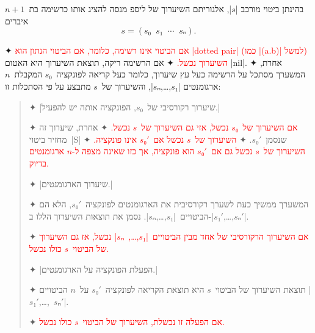\minipage\textwidth
\newcommand\exception[1]{{\textcolor{red}{#1}}}
\begin{mdframed}[backgroundcolor=Lavender!20]
  \footnotesize
  בהינתן ביטוי מורכב \E|$s$|, אלגוריתם השיערוך של ליספ מנסה
  להציג אותו כרשימה בת~$n+1$ איברים \[
    s=(s₀\;\;s₁\;\;⋯\;\;sₙ).
\] \begin{enumerate}
    ✦ \exception{
      אם הביטוי אינו רשימה, כלומר, אם הביטוי הנתון הוא \E|dotted pair| (כמו
      \E|(a.b)| למשל) השיערוך נכשל.}
    ✦ אם הרשימה ריקה, תוצאת השיערוך היא האטום \T|nil|.
    ✦ אחרת, המשערך מסתכל על הרשימה כעל עץ שיערוך, כלומר כעל קריאה
    לפונקציה~$s₀$ המקבלת~$n$ ארגומנטים \E|$s₁$,…,$sₙ$|, והשיערוך של~$s$ מתבצע
    על פי הסתכלות זו:
    \begin{quote}
      \begin{enumerate}
        ✦ \ע|שיערוך רקורסיבי של~$s₀$, הפונקציה אותה יש להפעיל.|
        \begin{itemize}
          ✦ \exception{אם השיערוך של~$s₀$ נכשל, אזי גם השיערוך של~$s$ נכשל.}
          ✦ אחרת, שיערוך זה מחזיר ביטוי~\E|S| שנסמן~$s₀'$.
          ✦ \exception{השיערוך של~$s$ נכשל אם~$s₀'$ אינו פונקציה.}
          ✦ \exception{השיערוך של~$s$ נכשל גם אם~$s₀'$ הוא פונקציה, אך כזו שאינה מצפה ל-$n$ ארגומנטים בדיוק.}
        \end{itemize}
        ✦ \ע|שיערוך הארגומנטים.|
        \begin{itemize}
          ✦ המשערך ממשיך כעת לשערך רקורסיבית את הארגומנטים לפונקציה~$s₀'$,
          הלא הם הביטויים~\E|$s₁$,…,$sₙ$|. נסמן את תוצאות השיערוך הללו
          ב-\E|$s₁'$,…,$sₙ'$|.

          ✦ \exception{אם השיערוך הרקורסיבי של אחד מבין
            הביטויים~\E|$s₁$,…,~$sₙ$| נכשל, אז גם השיערוך של הביטוי~$s$ כולו
            נכשל.}
        \end{itemize}

        ✦ \ע|הפעלת הפונקציה על הארגומנטים.|

        \begin{itemize}
          ✦ תוצאת השיערוך של הביטוי~$s$ היא תוצאת הקריאה לפונקציה~$s₀'$
          על~$n$ הביטויים \E|$s₁'$,…,~$sₙ'$|.

          ✦ \exception{אם הפעלה זו נכשלת, השיערוך של הביטוי~$s$ כולו נכשל.}
        \end{itemize}
      \end{enumerate}
    \end{quote}
  \end{enumerate}
\end{mdframed}
\endminipage

